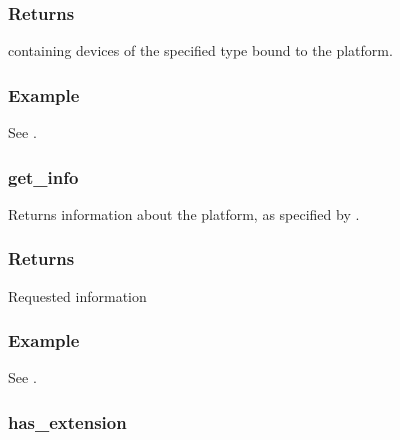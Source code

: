 \documentclass[letterpaper,10pt,english]{sphinxmanual}
\begin{document}
\subsubsection*{Returns}

 containing devices of the specified type bound to the
platform.
\subsubsection*{Example}

See {\hyperref[\detokenize{programming-interface/runtime/platform:platform-example}]{}}.


\subsubsection{get\_info}
\label{\detokenize{programming-interface/runtime/platform:get-info}}
\begin{sphinxVerbatim}[commandchars=\\\{\}]
   
    
\end{sphinxVerbatim}

Returns information about the platform, as specified by .
\subsubsection*{Returns}

Requested information
\subsubsection*{Example}

See {\hyperref[\detokenize{programming-interface/runtime/platform:platform-example}]{}}.


\subsubsection{has\_extension}
\label{\detokenize{programming-interface/runtime/platform:has-extension}}\label{\detokenize{programming-interface/runtime/platform:platform-has-extension}}
\begin{sphinxVerbatim}[commandchars=\\\{\}]
    
\end{sphinxVerbatim}
\end{document}
